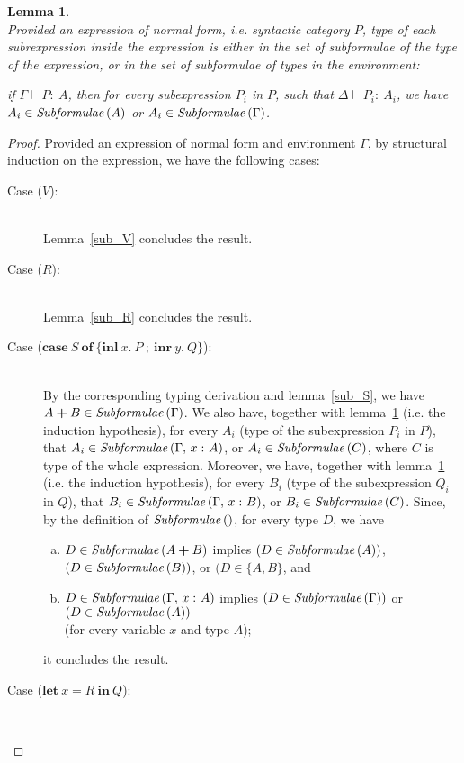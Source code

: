 \documentclass[11p,a4paper]{article}
\newcommand{\typecolor}{}
\newcommand{\termcolor}{}
\newcommand{\tp}[1]{{\typecolor #1}}
\newcommand{\tm}[1]{{\termcolor #1}}
\newtheorem{lemma}[theorem]{Lemma}
\newcommand{\typsum}[2]{#1\boldsymbol{+}#2}
\newcommand{\expshr}[3]{\mathbf{let}\ #1\boldsymbol{=}#2\ \mathbf{in}\ #3}
\newcommand{\expcas}[5]{\mathbf{case}\ #1\ \mathbf{of}\ \boldsymbol{\{}\mathbf{inl}\ #2.\ #3\ \boldsymbol{;}\ \mathbf{inr}\ #4.\ #5\boldsymbol{\}}}
\newcommand{\typing}[2]{\tm{#1:\ }\tp{#2}}
\newcommand{\typenvcon}[2]{\tp{\Gamma,}\ \typing{#1}{#2}}
\newcommand{\txt}[1]{\text{\textit{#1}}}
\newcommand{\subformulae}[1]{\txt{Subformulae}\,(#1)}
\begin{document}
\begin{lemma}\ \\
\label{sub_P}
Provided an expression of normal form, i.e. syntactic category $P$,
type of each subrexpression inside the expression is either in the set of
subformulae of the type of the expression, or in the set
of subformulae of types in the environment:

 if $\Gamma \vdash \typing{P}{A}$, then for every subexpression $P_i$
 in $P$, such that $\Delta \vdash \typing{P_i}{A_i}$, we have $A_i \in
 \subformulae{A}$ or $A_i \in \subformulae{\Gamma}$. 
\end{lemma}
\begin{proof}
Provided an expression of normal form and environment $\Gamma$,
by structural induction on the expression, we have the following cases:
\begin{description}
\item[Case ($V$):]\ \\
  Lemma~\ref{sub_V} concludes the result.
\item[Case ($R$):]\ \\
  Lemma~\ref{sub_R} concludes the result.
\item[Case ($\expcas{S}{x}{P}{y}{Q}$):]\ \\
  By the corresponding typing derivation and lemma~\ref{sub_S}, we
  have $\typsum{A}{B} \in \subformulae{\Gamma}$. We also have,
  together with lemma~\ref{sub_P} (i.e. the induction hypothesis), for
  every $A_i$ (type of the subexpression $P_i$ in $P$), that $A_i \in
  \subformulae{\typenvcon{x}{A}}$, or $A_i \in \subformulae{C}$, where
  $C$ is type of the whole expression. Moreover, we have, together
  with lemma~\ref{sub_P} (i.e. the induction hypothesis), for every
  $B_i$ (type of the subexpression $Q_i$ in $Q$), that $B_i \in
  \subformulae{\typenvcon{x}{B}}$, or $B_i \in \subformulae{C}$.
  Since, by the definition of $\subformulae{}$, for every type $D$, we have
  \begin{enumerate}[(a)] 
     \item $D \in \subformulae{\typsum{A}{B}}$ implies $(D \in \subformulae{A})$, $(D \in \subformulae{B})$, or $(D \in \{A,B\}$, and
     \item $D \in \subformulae{\typenvcon{x}{A}}$ implies $(D \in \subformulae{\Gamma})$ or $(D \in \subformulae{A})$\\ (for every variable $x$ and type $A$); 
  \end{enumerate}
  it concludes the result. 
\item[Case ($\expshr{x}{R}{Q}$):]\ \\

\end{description}
\end{proof}
\end{document}
